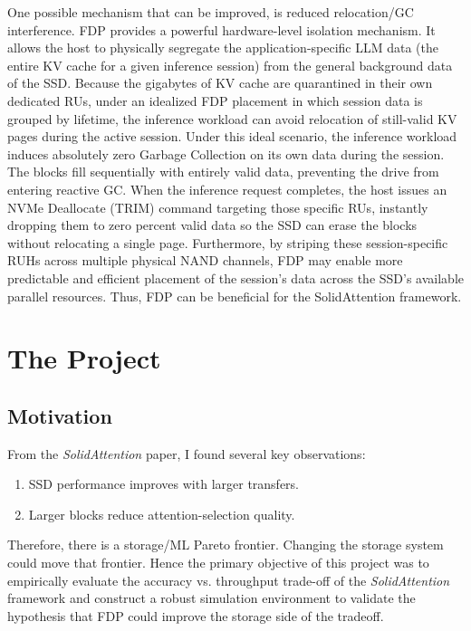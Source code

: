 \documentclass[conference]{IEEEtran}
\begin{document}
        One possible mechanism that can be improved, is reduced relocation/GC interference. FDP provides a powerful hardware-level isolation mechanism. It allows the host to physically segregate the application-specific LLM data (the entire KV cache for a given inference session) from the general background data of the SSD. Because the gigabytes of KV cache are quarantined in their own dedicated RUs, under an idealized FDP placement in which session data is grouped by lifetime, the inference workload can avoid relocation of still-valid KV pages during the active session. Under this ideal scenario, the inference workload induces absolutely zero Garbage Collection on its own data during the session. The blocks fill sequentially with entirely valid data, preventing the drive from entering reactive GC. When the inference request completes, the host issues an NVMe Deallocate (TRIM) command targeting those specific RUs, instantly dropping them to zero percent valid data so the SSD can erase the blocks without relocating a single page. Furthermore, by striping these session-specific RUHs across multiple physical NAND channels, FDP may enable more predictable and efficient placement of the session's data across the SSD's available parallel resources. Thus, FDP can be beneficial for the SolidAttention framework.

\section{The Project}
    \subsection{Motivation}
        From the \textit{SolidAttention}\cite{solidattention} paper, I found several key observations:
        \begin{enumerate}
            \item SSD performance improves with larger transfers.
            \item Larger blocks reduce attention-selection quality. 
        \end{enumerate}
        Therefore, there is a storage/ML Pareto frontier. Changing the storage system could move that frontier.
        Hence the primary objective of this project was to empirically evaluate the accuracy vs. throughput trade-off of the \textit{SolidAttention}\cite{solidattention} framework and construct a robust simulation environment to validate the hypothesis that FDP could improve the storage side of the tradeoff.
        
\end{document}
